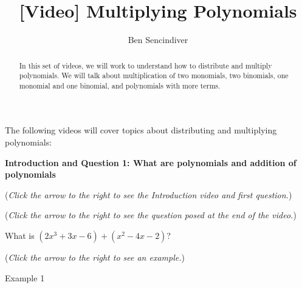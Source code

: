 \documentclass{ximera}
\title[Prerequisite Videos: ]{[Video] Multiplying Polynomials}
\author{Ben Sencindiver}
\begin{document}
\begin{abstract}
  In this set of videos, we will work to understand how to distribute and 
  multiply polynomials. We will talk about multiplication of two monomials, 
  two binomials, one monomial and one binomial, and polynomials with more terms. 
\end{abstract}
\maketitle

The following videos will cover topics about distributing and multiplying polynomials:

\textbf{Introduction and Question 1: What are polynomials and addition of polynomials}
\begin{question}
\begin{flushright}
{\color{blue}(\emph{Click the arrow to the right to see the Introduction video and first question.})}
\end{flushright}
\begin{center}
\begin{expandable}
\begin{flushright}
{\color{blue}(\emph{Click the arrow to the right to see the question
posed at the end of the video.})}
\end{flushright}
\begin{expandable}
What is $(2x^3 + 3x - 6) + (x^2 -4x -2)$?
\begin{multipleChoice}
\end{multipleChoice}
\begin{flushright}
{\color{blue}(\emph{Click the arrow to the right to see an example.})}
\end{flushright}
\begin{expandable}
\begin{center}
Example 1
\end{center}
\end{expandable}
\end{expandable}
\end{expandable}
\end{center}
\end{question}
\end{document}
